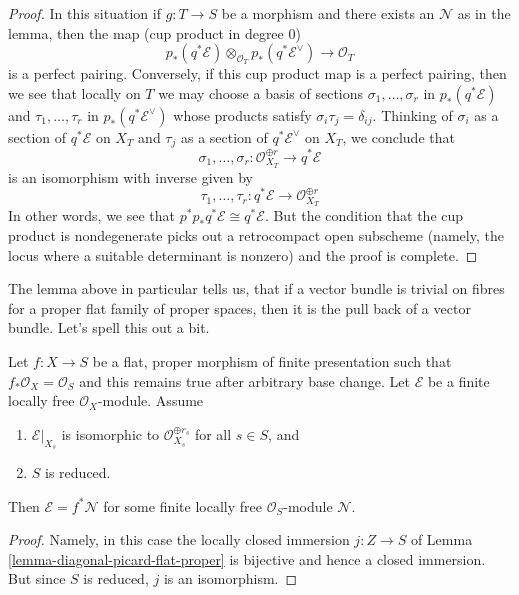 \begin{proof}
\medskip\noindent
In this situation if $g : T \to S$ be a morphism and there exists an
$\mathcal{N}$ as in the lemma, then the map (cup product in degree $0$)
$$
p_*(q^*\mathcal{E})
\otimes_{\mathcal{O}_T}
p_*(q^*\mathcal{E}^\vee)
\longrightarrow \mathcal{O}_T
$$
is a perfect pairing. Conversely, if this cup product map is a
perfect pairing, then we see that locally on $T$ we may choose a
basis of sections
$\sigma_1, \ldots, \sigma_r$ in $p_*(q^*\mathcal{E})$
and $\tau_1, \ldots, \tau_r$ in $p_*(q^*\mathcal{E}^\vee)$
whose products satisfy $\sigma_i \tau_j = \delta_{ij}$.
Thinking of $\sigma_i$ as a section of $q^*\mathcal{E}$ on $X_T$
and $\tau_j$ as a section of $q^*\mathcal{E}^\vee$ on $X_T$,
we conclude that
$$
\sigma_1, \ldots, \sigma_r :
\mathcal{O}_{X_T}^{\oplus r}
\longrightarrow
q^*\mathcal{E}
$$
is an isomorphism with inverse given by
$$
\tau_1, \ldots, \tau_r :
q^*\mathcal{E}
\longrightarrow
\mathcal{O}_{X_T}^{\oplus r}
$$
In other words, we see that $p^*p_*q^*\mathcal{E} \cong q^*\mathcal{E}$.
But the condition that the cup product is nondegenerate picks
out a retrocompact open subscheme (namely, the locus where a suitable
determinant is nonzero) and the proof is complete.
\end{proof}

\noindent
The lemma above in particular tells us, that if a vector bundle is
trivial on fibres for a proper flat family of proper spaces, then
it is the pull back of a vector bundle. Let's spell this out a bit.

\begin{lemma}
\label{lemma-trivial-on-fibres}
Let $f : X \to S$ be a flat, proper morphism of finite presentation
such that $f_*\mathcal{O}_X = \mathcal{O}_S$ and this remains
true after arbitrary base change. Let $\mathcal{E}$ be a finite
locally free $\mathcal{O}_X$-module. Assume
\begin{enumerate}
\item $\mathcal{E}|_{X_s}$ is isomorphic to
$\mathcal{O}_{X_s}^{\oplus r_s}$ for all $s \in S$, and
\item $S$ is reduced.
\end{enumerate}
Then $\mathcal{E} = f^*\mathcal{N}$ for some finite locally free
$\mathcal{O}_S$-module $\mathcal{N}$.
\end{lemma}

\begin{proof}
Namely, in this case the locally closed immersion $j : Z \to S$ of
Lemma \ref{lemma-diagonal-picard-flat-proper}
is bijective and hence a
closed immersion. But since $S$ is reduced, $j$ is an isomorphism.
\end{proof}

